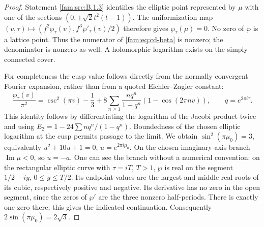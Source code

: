 \begin{proof}
Statement \ref{fam:src:B.1.3} identifies the elliptic point represented by \(\mu\) with
one of the sections \((0,\pm\sqrt2t^2(t-1))\). The uniformization map
\((v,\tau)\mapsto(f^2\wp_\tau(v),f^3\wp'_\tau(v)/2)\) therefore gives
\(\wp_\tau(\mu)=0\). No zero of \(\wp\) is a lattice point. Thus the numerator
of \eqref{fam:eq:cd-beta} is nonzero; the denominator is nonzero as well.
A holomorphic logarithm exists on the simply connected cover.

For completeness the cusp value follows directly from the normally
convergent Fourier expansion, rather than from a quoted Eichler--Zagier
constant:
\begin{equation}\label{fam:eq:cd-wp}
 \frac{\wp_\tau(v)}{\pi^2}
 =\csc^2(\pi v)-\frac13+
 8\sum_{n\geq1}\frac{nq^n}{1-q^n}(1-\cos(2\pi nv)),
 \qquad q=e^{2\pi i\tau}.
\end{equation}
This identity follows by differentiating the logarithm of the Jacobi
product twice and using
\(E_2=1-24\sum nq^n/(1-q^n)\). Boundedness of the chosen elliptic logarithm
at the cusp permits passage to the limit. We obtain
\(\sin^2(\pi\mu_0)=3\), equivalently
\(u^2+10u+1=0\), \(u=e^{2\pi i\mu_0}\).
On the chosen imaginary-axis branch \(\operatorname{Im}\mu<0\), so \(u=-a\).
One can see the branch without a numerical convention: on the rectangular
elliptic curve with \(\tau=iT\), \(T>1\), \(\wp\) is real on the segment
\(1/2-iy\), \(0\leq y\leq T/2\). Its endpoint values are the largest and
middle real roots of its cubic, respectively positive and negative.
Its derivative has no zero in the open segment, since the zeros of
\(\wp'\) are the three nonzero half-periods. There is exactly one zero
there; this gives the indicated continuation. Consequently
\(2\sin(\pi\mu_0)=2\sqrt3\).


\end{proof}
